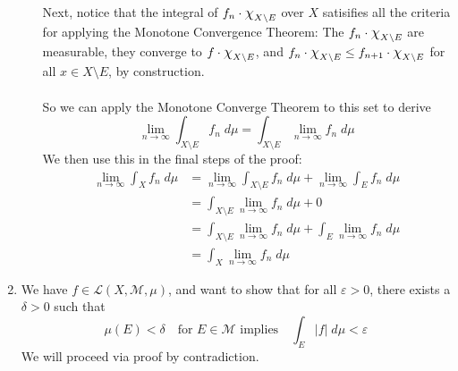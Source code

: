\documentclass[12pt]{article}
\theoremstyle{plain}
\theoremstyle{definition}
\theoremstyle{remark}
\newcommand*{\Chi}{\mbox{\large$\chi$}} %
\begin{document}
\begin{enumerate}
\begin{enumerate}
Next, notice that the integral of $f_n\cdot\Chi_{X\setminus E}$ over $X$ satisifies all the criteria for applying the Monotone Convergence Theorem: The $f_n\cdot\Chi_{X\setminus E}$ are measurable, they converge to $f\cdot\Chi_{X\setminus E}$, and $f_n\cdot\Chi_{X\setminus E}\leq f_{n+1}\cdot\Chi_{X\setminus E}$ for all $x\in X\setminus E$, by construction. 
\\
\\
So we can apply the Monotone Converge Theorem to this set to derive
\[
    \lim_{n\rightarrow\infty}\int_{X\setminus E} f_n \; d\mu=
    \int_{X\setminus E} \lim_{n\rightarrow\infty}f_n \; d\mu
\]
We then use this in the final steps of the proof:
\begin{align*}
    \lim_{n\rightarrow\infty}\int_{X} f_n \; d\mu&=
    \lim_{n\rightarrow\infty}\int_{X\setminus E} f_n \; d\mu
    +
    \lim_{n\rightarrow\infty}\int_{E} f_n \; d\mu \\
    &= 
    \int_{X\setminus E} \lim_{n\rightarrow\infty}f_n \; d\mu
    + 0 \\
    &= 
    \int_{X\setminus E} \lim_{n\rightarrow\infty}f_n \; d\mu
    + \int_{E} \lim_{n\rightarrow\infty}f_n \; d\mu\\
    &= \int_{X} \lim_{n\rightarrow\infty}f_n \; d\mu
\end{align*}



\end{enumerate}


\newpage
\item We have $f\in\mathscr{L}(X,\mathscr{M},\mu)$, and want to show that for all $\varepsilon>0$, there exists a $\delta>0$ such that 
\[
    \mu(E)<\delta \quad \text{for $E\in\mathscr{M}$ implies}
    \quad \int_E |f| \; d\mu <\varepsilon
\]
We will proceed via proof by contradiction.


\end{enumerate}
\end{document}
